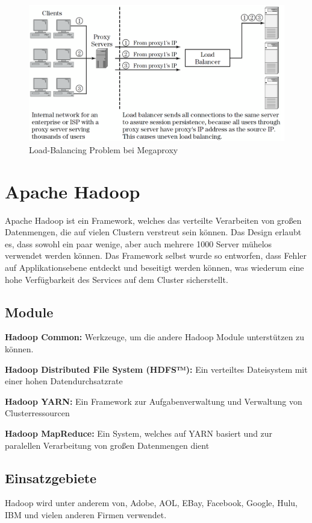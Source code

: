 \begin{figure}[!ht]
	\begin{center}
		\includegraphics[width=0.5\linewidth]{images/MegaProxy2.png}
		\caption{Load-Balancing Problem bei Megaproxy \cite{LoadBalancing2}}
		\label{Load-Balancing_Problem_bei_Megaproxy}
	\end{center}
\end{figure}

\section{Apache Hadoop}
\label{sec:Apache Hadoop}
Apache Hadoop ist ein Framework, welches das verteilte Verarbeiten von großen Datenmengen, die auf vielen Clustern verstreut sein können. Das Design erlaubt es, dass sowohl ein paar wenige, aber auch mehrere 1000 Server mühelos verwendet werden können. Das Framework selbst wurde so entworfen, dass Fehler auf Applikationsebene entdeckt und beseitigt werden können, was wiederum eine hohe Verfügbarkeit des Services auf dem Cluster sicherstellt. \cite{Hadoop1}

\subsection{Module}
\label{sec:Module}
\textbf{Hadoop Common:} Werkzeuge, um die andere Hadoop Module unterstützen zu können.

\textbf{Hadoop Distributed File System (HDFS™):} Ein verteiltes Dateisystem mit einer hohen Datendurchsatzrate

\textbf{Hadoop YARN:} Ein Framework zur Aufgabenverwaltung und Verwaltung von Clusterressourcen

\textbf{Hadoop MapReduce: } Ein System, welches auf YARN basiert und zur paralellen Verarbeitung von großen Datenmengen dient

\cite{Hadoop1}

\subsection{Einsatzgebiete}
\label{sec:Einsatzgebiete}
Hadoop wird unter anderem von, Adobe, AOL, EBay, Facebook, Google, Hulu, IBM und vielen anderen Firmen verwendet.
\cite{Hadoop2}

